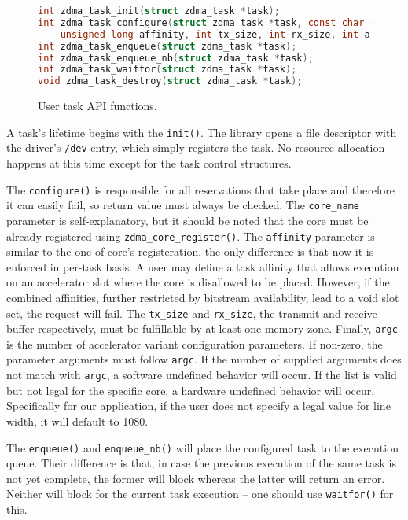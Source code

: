 \begin{figure}[H]
\centering
\begin{lstlisting}[style=basic,language=C]
int zdma_task_init(struct zdma_task *task);
int zdma_task_configure(struct zdma_task *task, const char *core_name,
	unsigned long affinity, int tx_size, int rx_size, int argc, ...);
int zdma_task_enqueue(struct zdma_task *task);
int zdma_task_enqueue_nb(struct zdma_task *task);
int zdma_task_waitfor(struct zdma_task *task);
void zdma_task_destroy(struct zdma_task *task);
\end{lstlisting}
\caption{User task API functions.}
\label{lst:api-user}
\end{figure}

A task's lifetime begins with the \texttt{init()}. The library opens
a file descriptor with the driver's \texttt{/dev} entry, which
simply registers the task. No resource allocation happens at this time
except for the task control structures.

The \texttt{configure()} is responsible for all 
reservations that take place and therefore it can easily fail, so return value must always be checked.
The \texttt{core\_name} parameter is self-explanatory,
but it should be noted that the core must be already registered using
\texttt{zdma\_core\_register()}. The \texttt{affinity} parameter is
similar to the one of core's registeration, the only difference is
that now it is enforced in per-task basis. A user may define a
task affinity that allows execution on an accelerator slot where
the core is disallowed to be placed. However, if the combined affinities,
further restricted by bitstream availability, lead to a void slot set,
the request will fail. The \texttt{tx\_size} and \texttt{rx\_size},
the transmit and receive buffer respectively, must be fulfillable by at least
one memory zone. Finally, \texttt{argc} is the number of accelerator variant 
configuration parameters. If non-zero, the parameter arguments must follow \texttt{argc}.
If the number of supplied arguments does not match with \texttt{argc},
a software undefined behavior will occur. If the list is valid but not legal
for the specific core, a hardware undefined behavior will occur. 
Specifically for our application, if the user does not specify a legal value
for line width, it will default to 1080.

The \texttt{enqueue()} and \texttt{enqueue\_nb()} will place the configured
task to the execution queue. Their difference is that, in case the previous
execution of the same task is not yet complete, the former will block
whereas the latter will return an error. Neither will block for the
current task execution -- one should use \texttt{waitfor()} for this.

